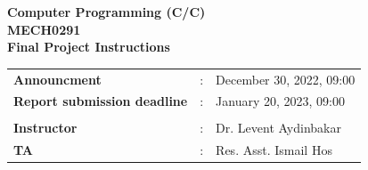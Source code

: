 \documentclass[addpoints]{exam}
\newcommand\CC{C\nolinebreak[4]\hspace{-.05em}\raisebox{.5ex}{\relsize{-3}{\textbf{++}}}}
\begin{document}
\begin{minipage}[c]{0.2\linewidth}
\end{minipage}
\begin{minipage}[c]{0.8\linewidth}
\begin{center}
\begin{LARGE}
\textbf{Computer Programming (C/\CC) 
\\ 
\vspace{0.2cm}
MECH0291}
\\
\vspace{0.4cm}
\textbf{Final Project Instructions}
\vspace{0.4cm}

\normalsize
\begin{tabular}{l l l }
\textbf{Announcment} &: & December 30, 2022, 09:00 \\
\textbf{Report submission deadline} &: & January 20, 2023, 09:00 \\
&& \\
\textbf{Instructor}		&:   & Dr. Levent Aydinbakar\\
\textbf{TA}		&:   & Res. Asst. Ismail Hos\\
\end{tabular}
\end{LARGE}
\end{center}
\end{minipage}
\end{document}
